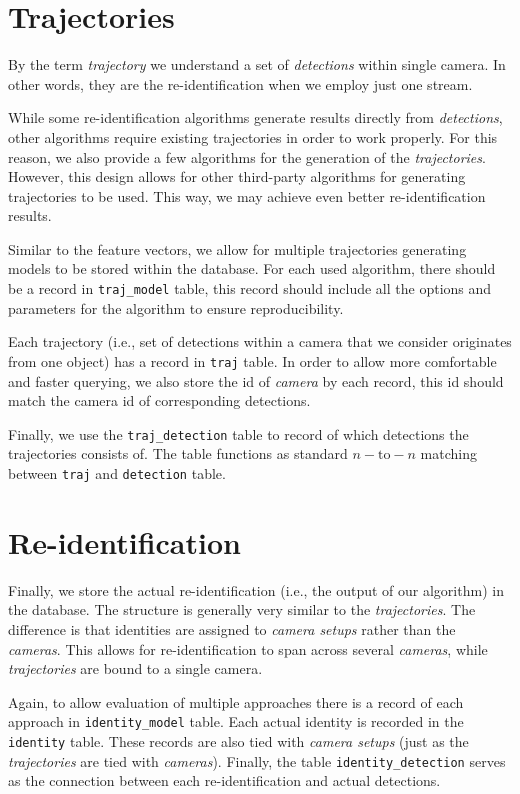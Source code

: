 \section{Trajectories}

By the term \emph{trajectory} we understand a set of \emph{detections} within
single camera. In other words, they are the re-identification when we employ just
one stream.

While some re-identification algorithms generate results directly from \emph{detections},
other algorithms require existing trajectories in order to
work properly. For this reason, we also provide a few algorithms for the generation
of the \emph{trajectories}. However, this design allows for other third-party
algorithms for generating trajectories to be used. This way, we may achieve
even better re-identification results.

Similar to the feature vectors, we allow for multiple trajectories generating
models to be stored within the database. For each used algorithm, there should
be a record in \texttt{traj\_model} table, this record should include all the options
and parameters for the algorithm to ensure reproducibility.

Each trajectory (i.e., set of detections within a camera that we consider originates
from one object) has a record in \texttt{traj} table. In order to allow more comfortable and
faster querying, we also store the id of \emph{camera} by each record, this id should
match the camera id of corresponding detections.

Finally, we use the \texttt{traj\_detection} table to record of which detections
the trajectories consists of. The table functions as standard $n-\textrm{to}-n$
matching between \texttt{traj} and \texttt{detection} table.

\section{Re-identification}

Finally, we store the actual re-identification (i.e., the output of our algorithm)
in the database. The structure is generally very similar to the \emph{trajectories}. The difference is
that identities are assigned to \emph{camera setups} rather than
the \emph{cameras}. This allows for re-identification to span across several \emph{cameras}, while \emph{trajectories} are bound to a single camera.

Again, to allow evaluation of multiple approaches there is a record of each approach
in \texttt{identity\_model} table. Each actual identity is recorded in the
\texttt{identity} table. These records are also tied with \emph{camera setups}
(just as the \emph{trajectories} are tied with \emph{cameras}). Finally, the table
\texttt{identity\_detection} serves as the connection between each re-identification
and actual detections.

